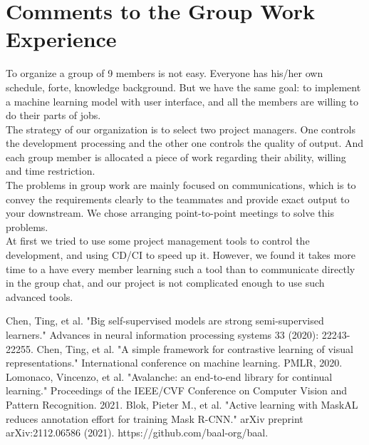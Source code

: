 \documentclass[lang=english,inputenc=utf8,fontsize=10pt]{ldvarticle}
\begin{document}
\section{Comments to the Group Work Experience}
To organize a group of 9 members is not easy. Everyone has his/her own schedule, forte, knowledge background. But we have the same goal: to implement a machine learning model with user interface, and all the members are willing to do their parts of jobs.\\

The strategy of our organization is to select two project managers. One controls the development processing and the other one controls the quality of output. And each group member is allocated a piece of work regarding their ability, willing and time restriction.\\

The problems in group work are mainly focused on communications, which is to convey the requirements clearly to the teammates and provide exact output to your downstream. We chose arranging point-to-point meetings to solve this problems.\\

At first we tried to use some project management tools to control the development, and using CD/CI to speed up it. However, we found it takes more time to a have every member learning such a tool than to communicate directly in the group chat, and our project is not complicated enough to use such advanced tools.\\


\newpage
\begin{thebibliography}{99}  
Chen, Ting, et al. "Big self-supervised models are strong semi-supervised learners." Advances in neural information processing systems 33 (2020): 22243-22255.
Chen, Ting, et al. "A simple framework for contrastive learning of visual representations." International conference on machine learning. PMLR, 2020.
Lomonaco, Vincenzo, et al. "Avalanche: an end-to-end library for continual learning." Proceedings of the IEEE/CVF Conference on Computer Vision and Pattern Recognition. 2021.
Blok, Pieter M., et al. "Active learning with MaskAL reduces annotation effort for training Mask R-CNN." arXiv preprint arXiv:2112.06586 (2021).
https://github.com/baal-org/baal.
\end{thebibliography}
\end{document}

